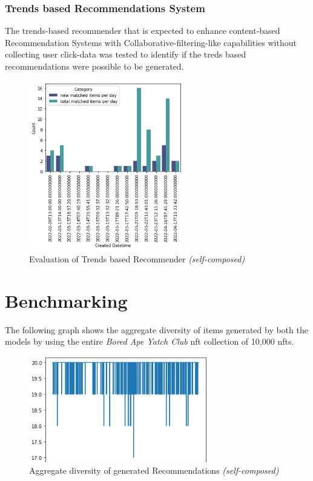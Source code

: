 \subsubsection{Trends based Recommendations System}


The trends-based recommender that is expected to enhance content-based Recommendation Systems with Collaborative-filtering-like capabilities without collecting user click-data was tested to identify if the treds based recommendations were possible to be generated.


\begin{figure}[h!]
\centering
\includegraphics[width=0.6\textwidth]{images/Testing/trends/trends-matches-eval1.png}
\caption{Evaluation of Trends based Recommender \textit{(self-composed)}}
\label{fig:trends-recsys-new-matches}
\end{figure}


\section{Benchmarking}
\label{sec:test-benchmarking}

The following graph shows the aggregate diversity of items generated by both the models by using the entire \textit{Bored Ape Yatch Club} \gls{nft} collection of 10,000 \gls{nft}s.

\begin{figure}[h!]
\centering
\includegraphics[width=0.7\textwidth]{images/Testing/trait/aggregate diversity.png}
\caption{Aggregate diversity of generated Recommendations \textit{(self-composed)}}
\label{fig:aggregate-diversity-traits}
\end{figure}

